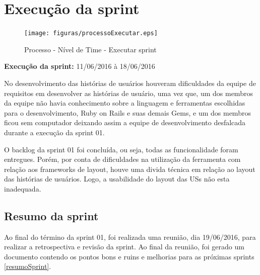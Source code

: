 \section{Execução da sprint}

\begin{figure}[H]
    \centering
    \label{identificarExecutar}
    \texttt{[image: figuras/processoExecutar.eps]}
    \caption[Executar sprint]{Processo - Nível de Time - Executar sprint}
\end{figure}

\textbf{Execução da sprint:} 11/06/2016 à 18/06/2016

No desenvolvimento das histórias de usuários houveram dificuldades da equipe de requisitos em desenvolver as histórias de usuário, uma vez que, um dos membros da equipe não havia conhecimento sobre a linguagem e ferramentas escolhidas para o desenvolvimento, Ruby on Rails e suas demais Gems, e um dos membros ficou sem computador deixando assim a equipe de desenvolvimento desfalcada durante a execução da sprint 01.

O backlog da sprint 01 foi concluída, ou seja, todas as funcionalidade foram entregues. Porém, por conta de dificuldades na utilização da ferramenta com relação aos frameworks de layout, houve uma divida técnica em relação ao layout das histórias de usuários. Logo, a usabilidade do layout das USs não esta inadequada.

\subsection{Resumo da sprint}

Ao final do término da sprint 01, foi realizada uma reunião, dia 19/06/2016, para realizar a retrospectiva e revisão da sprint. Ao final da reunião, foi gerado um documento contendo os pontos bons e ruins e melhorias para as próximas sprints \ref{resumoSprint}.


